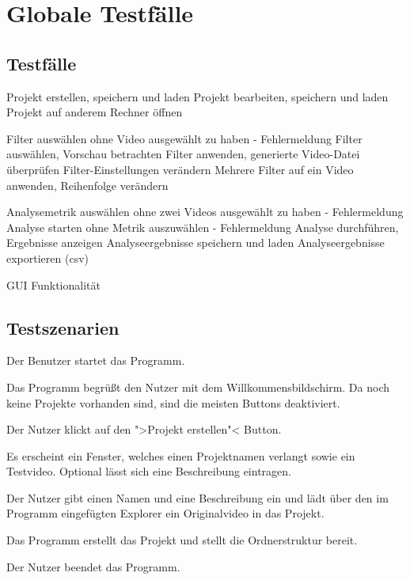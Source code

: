 \chapter{Globale Testfälle}
\section{Testfälle}
\setcounter{counterKriterien}{0}

 Projekt erstellen, speichern und laden
 Projekt bearbeiten, speichern und laden
 Projekt auf anderem Rechner öffnen

 Filter auswählen ohne Video ausgewählt zu haben - Fehlermeldung
 Filter auswählen, Vorschau betrachten
 Filter anwenden, generierte Video-Datei überprüfen
 Filter-Einstellungen verändern
 Mehrere Filter auf ein Video anwenden, Reihenfolge verändern

 Analysemetrik auswählen ohne zwei Videos ausgewählt zu haben - Fehlermeldung
 Analyse starten ohne Metrik auszuwählen - Fehlermeldung
 Analyse durchführen, Ergebnisse anzeigen
 Analyseergebnisse speichern und laden
 Analyseergebnisse exportieren (csv)

 GUI Funktionalität




\section{Testszenarien}
\setcounter{counterKriterien}{0}
   \begin{compactenum}[1]
\item Der Benutzer startet das Programm.
\item Das Programm begrüßt den Nutzer mit dem Willkommensbildschirm. Da noch keine Projekte vorhanden sind, sind die meisten Buttons deaktiviert.
\item Der Nutzer klickt auf den ">Projekt erstellen"< Button.
\item Es erscheint ein Fenster, welches einen Projektnamen verlangt sowie ein Testvideo. Optional lässt sich eine Beschreibung eintragen.
\item Der Nutzer gibt einen Namen und eine Beschreibung ein und lädt über den im Programm eingefügten Explorer ein Originalvideo in das Projekt.
\item Das Programm erstellt das Projekt und stellt die Ordnerstruktur bereit.
\item Der Nutzer beendet das Programm.

\end{compactenum}

